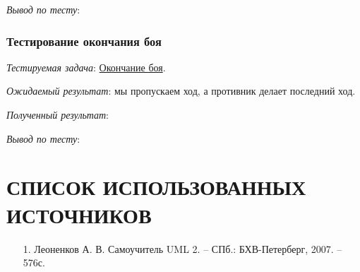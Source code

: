 \documentclass[12pt, a4paper, simple]{eskdtext}
\begin{document}
    \textit{Вывод по тесту}:


    \subsubsection*{Тестирование окончания боя}

    \textit{Тестируемая задача}: \underline{Окончание боя}.
    
    \textit{Ожидаемый результат}: мы пропускаем ход, а противник делает последний ход.
    
    \textit{Полученный результат}:

    \textit{Вывод по тесту}:

    \newpage

    \newpage
    \section*{СПИСОК ИСПОЛЬЗОВАННЫХ ИСТОЧНИКОВ}
    \begin{enumerate}
        \item[1.] Леоненков А. В.
        Самоучитель UML 2. -- СПб.: БХВ-Петерберг, 2007. -- 576с.
    \end{enumerate}
    \newpage
\end{document}

